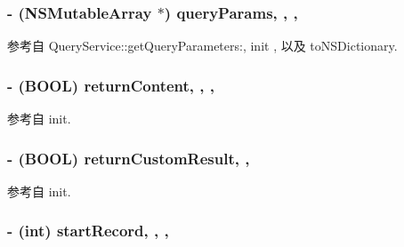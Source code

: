 \hypertarget{interface_query_parameters_a83a59495a5d42b0d0e14e09c1c1b3697}{
\subsubsection[{query\-Params}]{\setlength{\rightskip}{0pt plus 5cm}-\/ (N\-S\-Mutable\-Array $\ast$) query\-Params\hspace{0.3cm}{\ttfamily [read]}, {\ttfamily [write]}, {\ttfamily [atomic]}, {\ttfamily [copy]}}}\label{interface_query_parameters_a83a59495a5d42b0d0e14e09c1c1b3697}


参考自 Query\-Service\-::get\-Query\-Parameters\-:, init , 以及 to\-N\-S\-Dictionary.

\hypertarget{interface_query_parameters_a23d9965d1a1aa8ff9626f1a0b2abf85c}{
\subsubsection[{return\-Content}]{\setlength{\rightskip}{0pt plus 5cm}-\/ (B\-O\-O\-L) return\-Content\hspace{0.3cm}{\ttfamily [read]}, {\ttfamily [write]}, {\ttfamily [atomic]}, {\ttfamily [assign]}}}\label{interface_query_parameters_a23d9965d1a1aa8ff9626f1a0b2abf85c}


参考自 init.

\hypertarget{interface_query_parameters_ab62ff61d19899b96890efb932bf8c90a}{
\subsubsection[{return\-Custom\-Result}]{\setlength{\rightskip}{0pt plus 5cm}-\/ (B\-O\-O\-L) return\-Custom\-Result\hspace{0.3cm}{\ttfamily [read]}, {\ttfamily [atomic]}, {\ttfamily [assign]}}}\label{interface_query_parameters_ab62ff61d19899b96890efb932bf8c90a}


参考自 init.

\hypertarget{interface_query_parameters_adf4931c1732408ec8f3406a788850985}{
\subsubsection[{start\-Record}]{\setlength{\rightskip}{0pt plus 5cm}-\/ (int) start\-Record\hspace{0.3cm}{\ttfamily [read]}, {\ttfamily [write]}, {\ttfamily [atomic]}, {\ttfamily [assign]}}}\label{interface_query_parameters_adf4931c1732408ec8f3406a788850985}


